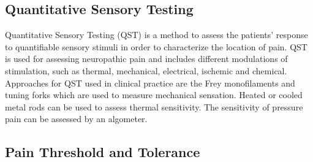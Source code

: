 \subsection{Quantitative Sensory Testing}
Quantitative Sensory Testing (QST) is a method to assess the patients' response to quantifiable sensory stimuli in order to characterize the location of pain. QST is used for assessing neuropathic pain and includes different modulations of stimulation, such as thermal, mechanical, electrical, ischemic and chemical. %
Approaches for QST used in clinical practice are the Frey monofilaments and tuning forks which are used to measure mechanical sensation. Heated or cooled metal rods can be used to assess thermal sensitivity. The sensitivity of pressure pain can be assessed by an algometer. \cite{Fillingim2016}

\subsection{Pain Threshold and Tolerance}\label{sec:AoPT}


